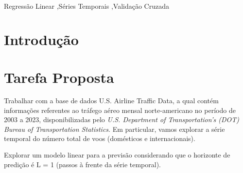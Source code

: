 \documentclass[final,5p]{elsarticle}
\numberwithin{equation}{section}
\begin{document}
\begin{frontmatter}

\begin{keyword}
    Regressão Linear \sep Séries Temporais \sep Validação Cruzada



\end{keyword}

\end{frontmatter}

\section{Introdução}


\section{Tarefa Proposta}

    Trabalhar com a base de dados U.S. Airline Traffic Data, a qual contém informações referentes ao tráfego aéreo mensal norte-americano no período de 2003 a 2023, disponibilizadas pelo \emph{U.S. Department of Transportation’s (DOT) Bureau of Transportation Statistics}. Em particular, vamos explorar a série temporal do número total de voos (domésticos e internacionais).

    Explorar um modelo linear para a previsão considerando que o horizonte de predição é L = 1 (passos à frente da série temporal).
\end{document}
